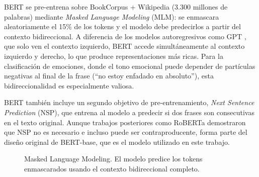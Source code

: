 BERT se pre-entrena sobre BookCorpus + Wikipedia (3.300 millones de palabras)
mediante \textit{Masked Language Modeling} (MLM): se enmascara aleatoriamente
el 15\% de los tokens y el modelo debe predecirlos a partir del contexto
bidireccional. A diferencia de los modelos autoregresivos como GPT
\cite{radford2018improving}, que solo ven el contexto izquierdo, BERT accede
simultáneamente al contexto izquierdo y derecho, lo que produce representaciones
más ricas. Para la clasificación de emociones, donde el tono emocional puede
depender de partículas negativas al final de la frase (``no estoy enfadado
en absoluto''), esta bidireccionalidad es especialmente valiosa.

BERT también incluye un segundo objetivo de pre-entrenamiento, \textit{Next Sentence
Prediction} (NSP), que entrena al modelo a predecir si dos frases son consecutivas
en el texto original. Aunque trabajos posteriores como RoBERTa \cite{liu2019roberta}
demostraron que NSP no es necesario e incluso puede ser contraproducente, forma
parte del diseño original de BERT-base, que es el modelo utilizado en este trabajo.

\begin{figure}[H]
    \centering
    \shorthandoff{><}
    \shorthandon{><}
    \caption{Masked Language Modeling. El modelo predice los tokens enmascarados
    usando el contexto bidireccional completo.}
    \label{fig:mlm}
\end{figure}

